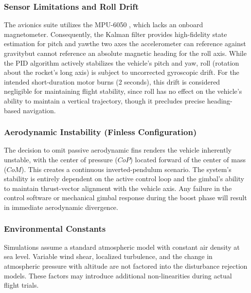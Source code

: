 \subsubsection{Sensor Limitations and Roll Drift}
\label{subsubsec:sensor_limits}

The avionics suite utilizes the MPU-6050 \cite{invensense_mpu6050}, which lacks an onboard magnetometer. Consequently, the Kalman filter provides high-fidelity state estimation for pitch and yaw\textemdash the two axes the accelerometer can reference against gravity\textemdash but cannot reference an absolute magnetic heading for the roll axis. While the PID algorithm actively stabilizes the vehicle's pitch and yaw, roll (rotation about the rocket's long axis) is subject to uncorrected gyroscopic drift. For the intended short-duration motor burns (2 seconds), this drift is considered negligible for maintaining flight stability, since roll has no effect on the vehicle's ability to maintain a vertical trajectory, though it precludes precise heading-based navigation.

\subsubsection{Aerodynamic Instability (Finless Configuration)}

The decision to omit passive aerodynamic fins renders the vehicle inherently unstable, with the
center of pressure ($CoP$) located forward of the center of mass ($CoM$). This creates a
continuous inverted-pendulum scenario. The system's stability is entirely dependent on the active
control loop and the gimbal's ability to maintain thrust-vector alignment with the vehicle axis.
Any failure in the control software or mechanical gimbal response during the boost phase will
result in immediate aerodynamic divergence.

\subsubsection{Environmental Constants}

Simulations assume a standard atmospheric model with constant air density at sea level. Variable
wind shear, localized turbulence, and the change in atmospheric pressure with altitude are not
factored into the disturbance rejection models. These factors may introduce additional
non-linearities during actual flight trials.

